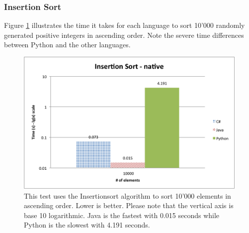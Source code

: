 \subsubsection{Insertion Sort}

Figure \ref{fig:native_insertion_sort} illustrates the time it takes for each language to sort 10'000 randomly generated positive integers in ascending order. Note the severe time differences between Python and the other languages.

\begin{figure}[h]
	\centering
	\includegraphics[width=1.0\linewidth]{chapters/new_media/InsertionSortNative.png}
	\caption{This test uses the Insertionsort algorithm to sort 10'000 elements in ascending order. Lower is better. Please note that the vertical axis is base 10 logarithmic. Java is the fastest with 0.015 seconds while Python is the slowest with 4.191 seconds. }
	\label{fig:native_insertion_sort}
\end{figure}
